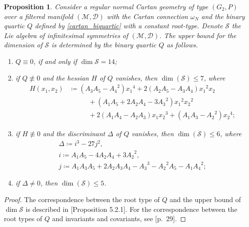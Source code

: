 \documentclass{amsart}
\theoremstyle{plain}
\newtheorem{proposition}[theorem]{Proposition}
\theoremstyle{definition}
\theoremstyle{remark}
\newcommand{\mc}[1]{\mathcal{#1}}
\begin{document}
\begin{proposition} \label{prop:biquartic}
    Consider a regular normal Cartan geometry of type $(G_2,P)$ over a filtered manifold $(\mc{M,\mc{D}})$ with the Cartan connection $\omega_N$ and the binary quartic $Q$ defined by \eqref{cartan_biquartic} with a constant root-type. Denote $\mc{S}$ the Lie algebra of infinitesimal symmetries of $(\mc{M},\mc{D})$. The upper bound for the dimension of $\mc{S}$ is determined by the binary quartic $Q$ as follows.
    \begin{enumerate}[label=\arabic*)]
        \item $Q \equiv 0$, if and only if $\dim \mc{S} = 14$;
        \item if $Q \not\equiv 0$ and the hessian $H$ of $Q$ vanishes,
        then $\dim (\mc{S}) \leq 7$, where
            \begin{equation*}
            \begin{aligned}
                H(x_1,x_2) &\coloneqq (A_3 A_5 - {A_4}^2) {x_1}^4 + 2 (A_2 A_5 - A_3 A_4) {x_1}^2 x_2\\
                &\phantom{\coloneqq= {}} + (A_1 A_5 + 2 A_2 A_4 - 3 {A_3}^2) {x_1}^2 {x_2}^2\\
                &\phantom{\coloneqq= {}} + 2 (A_1 A_4 - A_2 A_3) {x_1} {x_2}^3 + (A_1 A_3 - {A_2}^2) {x_2}^4;
            \end{aligned}
            \end{equation*}
        \item if $H \not\equiv 0$ and the discriminant $\Delta$ of $Q$ vanishes, then $\dim (\mc{S}) \leq 6$, where
            \begin{equation*}
            \begin{gathered}
                \Delta \coloneqq i^3 - 27j^2,\\
                i\coloneqq A_1 A_5 - 4 A_2 A_4 + 3 {A_2}^2,\\
                j \coloneqq A_1 A_3 A_5 + 2A_2 A_3 A_4 - {A_3}^3 - {A_2}^2 A_5 - A_1 {A_4}^2;
            \end{gathered}
            \end{equation*}
        \item if $\Delta \neq 0$, then $\dim (\mc{S}) \leq 5$.
    \end{enumerate}
\end{proposition}
\begin{proof}
    The correspondence between the root type of $Q$ and the upper bound of $\dim \mc{S}$ is described in \cite{bkdt2017}[Proposition 5.2.1]. For the correspondence between the root types of $Q$ and invariants and covariants, see \cite{olver}[p.~29].
\end{proof}
\end{document}
